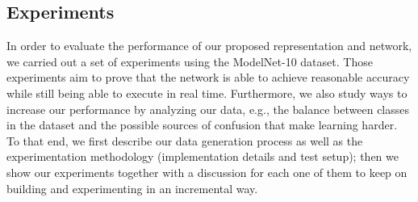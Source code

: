 \subsection{Experiments}
\label{cha:objrecog:sec:pointnet:subsec:experiments}

In order to evaluate the performance of our proposed representation and network, we carried out a set of experiments using the ModelNet-10 dataset. Those experiments aim to prove that the network is able to achieve reasonable accuracy while still being able to execute in real time. Furthermore, we also study ways to increase our performance by analyzing our data, e.g., the balance between classes in the dataset and the possible sources of confusion that make learning harder. To that end, we first describe our data generation process as well as the experimentation methodology (implementation details and test setup); then we show our experiments together with a discussion for each one of them to keep on building and experimenting in an incremental way.


